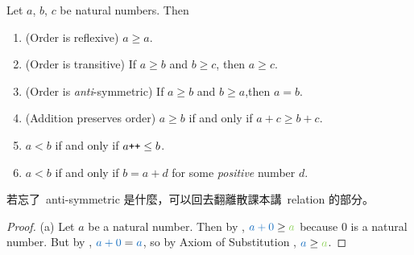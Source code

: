 \begin{proposition}  \label{prop 2.2.12}
Let \(a\), \(b\), \(c\) be natural numbers. Then
    \begin{enumerate}
        \item (Order is reflexive) \(a \geq a\).
        \item (Order is transitive) If \(a \geq b\) and \(b \geq c\), then \(a \geq c\).
        \item (Order is \emph{anti}-symmetric) If \(a \geq b\) and \(b \geq a\),then \(a = b\). 
        \item (Addition preserves order) \(a \geq b\) if and only if \(a + c \geq b + c\). 
        \item \(a < b\) if and only if \(a\texttt{++} \leq b\).
        \item \(a < b\) if and only if \(b = a + d\) for some \emph{positive} number \(d\).
    \end{enumerate}
\end{proposition}
\begin{note}
若忘了\ anti-symmetric 是什麼，可以回去翻離散課本講\ relation 的部分。
\end{note}
\begin{proof}{(a)}
Let \(a\) be a natural number. Then by , \(\BLUE{a + 0} \geq \GREEN{a}\) because \(0\) is a natural number. But by , \(\BLUE{a + 0} = \BLUE{a}\), so by Axiom of Substitution , \(\BLUE{a} \geq \GREEN{a}\).
\end{proof}


